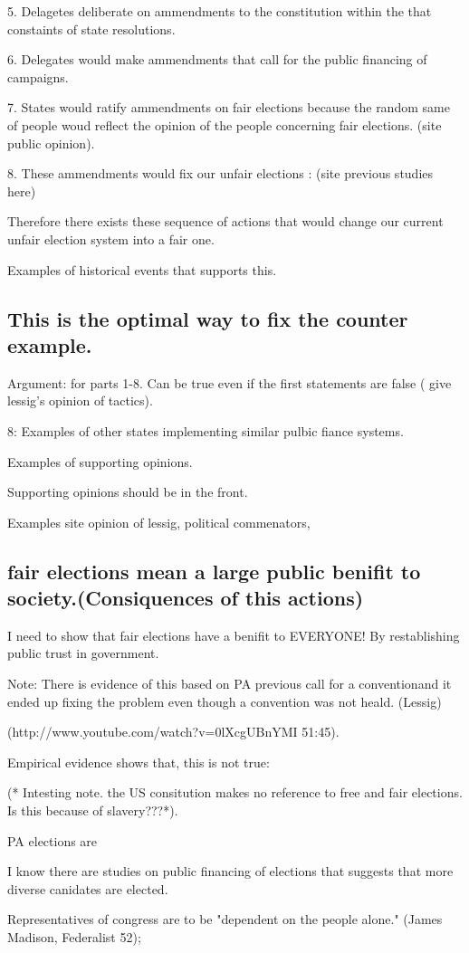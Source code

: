\documentclass[11pt]{article} %
\begin{document}
\begin{enumerate}
5.  Delagetes deliberate on ammendments to the constitution within the that constaints of state resolutions.  

6. Delegates would make ammendments that call for the public financing of campaigns.

7.  States would ratify ammendments on fair elections because the random same of people woud reflect the opinion of the people concerning fair elections. (site public opinion).

8. These ammendments would fix our unfair elections : (site previous studies here)


Therefore there exists these sequence of actions that would change our current unfair election system into a fair one. 

Examples of historical events that supports this. 



\subsection{This is the optimal way to fix the counter example.}

Argument: for parts 1-8.  Can be true even if the first statements are false ( give lessig's opinion of tactics). 

8:  Examples of other states implementing similar pulbic fiance systems. 

Examples of supporting opinions.

Supporting opinions should be in the front. 

Examples site opinion of lessig, political commenators, 

\subsection{fair elections mean a large public benifit to society.(Consiquences of this actions)}

I need to show that fair elections have a benifit to EVERYONE! By restablishing public trust in government. 


Note:  There is evidence of this based on PA previous call for a conventionand it ended up fixing the problem even though a convention was not heald. (Lessig)


(http://www.youtube.com/watch?v=0lXcgUBnYMI   51:45).



Empirical evidence shows that, this is not true:  

(* Intesting note.  the US consitution makes no reference to free and fair elections. Is this because of slavery???*). 

PA elections are 

I know there are studies on public financing of elections that suggests that more diverse canidates are elected. 

Representatives of congress are to be "dependent on the people alone." (James Madison, Federalist 52); 




\end{enumerate}
\end{document}
